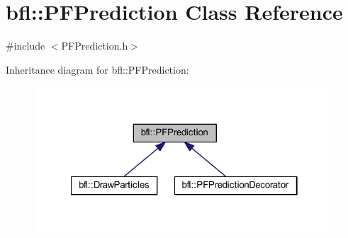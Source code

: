 \hypertarget{classbfl_1_1PFPrediction}{}\section{bfl\+:\+:P\+F\+Prediction Class Reference}
\label{classbfl_1_1PFPrediction}


{\ttfamily \#include $<$P\+F\+Prediction.\+h$>$}



Inheritance diagram for bfl\+:\+:P\+F\+Prediction\+:
\nopagebreak
\begin{figure}[H]
\begin{center}
\leavevmode
\includegraphics[width=322pt]{classbfl_1_1PFPrediction__inherit__graph}
\end{center}
\end{figure}
